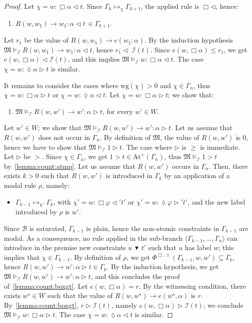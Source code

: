 \documentclass[copyright,creativecommons]{eptcs}
\newcommand{\Diam}{\lozenge}
\newcommand{\Phibd}[1]{\Phi^{\Box,\Diam}(#1)}
\newcommand{\gt}{\rhd}
\newcommand{\lt}{\lhd}
\newcommand{\stru}[1]{\langle #1 \rangle} %
\newcommand{\abstractorder}{\,\blacktriangledown\,}%
\newcommand{\wg}[1]{\mathrm{wg}(#1)}
\newcommand{\Atmp}[1]{\mathrm{At}^{+}\!(#1)}
\newcommand{\app}[3]{#2\mapsto_{#1} #3}
\newcommand{\M}{\mathfrak{M}}
\renewcommand{\a}{\alpha}
\newcommand{\G}{\Gamma}
\newcommand{\Bcal}{\mathcal{B}}
\newcommand{\Ical}{\mathcal{I}}
\begin{document}
\begin{proof}
 Let $\chi= w:\Box\a\lt t$.  Since $\app{\chi}{\G_k}{\G_{k+1}}$, the
 applied rule is $\Box\lt$, hence:
 \begin{enumerate}[label=(\Alph*), ref=(\Alph*),leftmargin=*,start=4]
   
 \item\label{lemma:count:boxlt}
   $R(w,w_1)\to w_1:\a\lt t \, \in \G_{k+1}$.
 \end{enumerate}
 Let $r_1$ be the value of $R(w,w_1)\to e(w_1:\a)$.  By the induction
 hypothesis $\M\models_\Ical R(w,w_1)\to w_1:\a\lt t $, hence $r_1\lt\
 \Ical(t)$.  Since $e(w,\Box\a)\leq r_1$, we get $e(w,\Box\a) \lt
 \Ical(t)$, and this implies $\M\models_\Ical w:\Box\a\lt t$.  The
 case $\chi= w:\Diam\a\gt t$ is similar.

 It remains to consider the cases where $\wg{\chi}>0$ and $\chi\in
 \G_n$, thus $\chi= w:\Box\a\gt t$ or $\chi= w:\Diam\a\lt t$.  Let
 $\chi= w:\Box\a\gt t$; we show that:

 \begin{enumerate}[label=(\Alph*), ref=(\Alph*),leftmargin=*,start=5]
 \item\label{lemma:count:boxgt}
   $\M\models_\Ical R(w,w') \to w':\a\gt t$, for every  $w'\in W$.
 \end{enumerate}
 Let $w'\in W$; we show that $\M\models_\Ical R(w,w') \to w':\a\gt t$.
 Let us assume that $R(w,w')$ does not occur in $\G_n$.  By definition
 of $\M$, the value of $R(w,w')$ is 0, hence we have to show that
 $\M\models_\Ical 1 \gt t$.  The case where $\gt$ is $\geq$ is
 immediate.  Let $\gt$ be $>$.  Since $\chi\in\G_n$, we get $1
 >t\in\Atmp{\G_n}$, thus $\M\models_\Ical1 > t$
 by~\ref{lemma:count:atmp}.  Let us assume that $R(w,w')$ occurs in
 $\G_n$.  Then, there exists $k > 0$ such that $R(w,w')$ is
 introduced in $\G_{k}$ by an application of a modal rule $\rho$,
 namely:
 \begin{itemize}
 \item $\app{\chi'}{\G_{k-1}}{\G_k}$, with $\chi' = w :\Box \varphi \lt' t'$ 
   or  $\chi' = w :\Diam\varphi \gt' t'$,
   and the new label introduced by $\rho$ is  $w'$.
 \end{itemize}
 Since $\Bcal$ is saturated, $\G_{k-1}$ is plain, hence the non-atomic
 constraints in $\G_{k-1}$ are modal.  As a consequence, no rule
 applied in the sub-branch $\stru{\G_{k-1},\dots,\G_n}$ can introduce
 in the premise new constraints $u\abstractorder t'$ such that $u$ has
 label $w$; this implies that $\chi\in \G_{k-1}$.  By definition of
 $\rho$, we get $\Phibd{\G_{k-1},w,w'}\subseteq \G_{k}$, hence
 $R(w,w') \to w':\a\gt t \in\G_{k}$. By the induction hypothesis, we
 get $\M\models_\Ical R(w,w') \to w':\a\gt t$, and this concludes the
 proof of~\ref{lemma:count:boxgt}.  Let $e(w,\Box\a)=r$.  By the witnessing condition,
  there exists $w^\star\in W$ such that the value of
 $R(w,w^\star) \to e(w^\star,\a)$ is $r$.  By~\ref{lemma:count:boxgt},
 $r\gt \Ical(t)$, namely $e(w,\Box\a)\gt \Ical(t)$; we conclude
 $\M\models_\Ical w:\Box\a\gt t$.  The case $\chi= w:\Diam\a\lt t$ is
 similar.
\end{proof}
\end{document}
